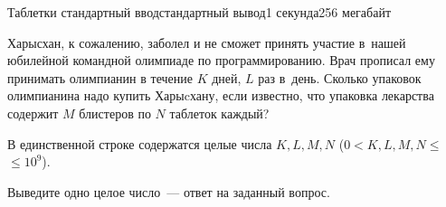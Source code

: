 \begin{problem}[(Эверстов В.\,В.)]{Таблетки \label{pills}}{стандартный ввод}{стандартный вывод}{1 секунда}{256 мегабайт}

Харысхан, к сожалению, заболел и не сможет принять участие в~нашей юбилейной командной олимпиаде по программированию. Врач прописал ему принимать олимпианин в течение $K$ дней, $L$ раз в~день. Сколько упаковок олимпианина надо купить Харыcхану, если известно, что упаковка лекарства содержит $M$ блистеров по $N$ таблеток каждый?

\InputFile
В единственной строке содержатся целые числа $K, L, M, N$ ($0<K,L,M,N\leq$ $\leq 10^9$). 

\OutputFile
Выведите одно целое число~--- ответ на заданный вопрос.

\Example

\begin{example}
%
\end{example}

\end{problem}

